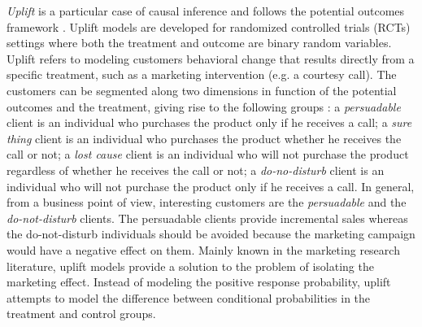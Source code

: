 \documentclass{article}
\begin{document}
\textit{Uplift} is a particular case of causal inference and follows the potential outcomes framework \citep{rubin1974estimating, holland1986statistics}. Uplift models are developed for randomized controlled trials (RCTs) settings where both the treatment and outcome are binary random variables. Uplift refers to modeling customers behavioral change that results directly from a specific treatment, such as a marketing intervention (e.g. a courtesy call). The customers can be segmented along two dimensions in function of the potential outcomes and the treatment, giving rise to the following groups \citep{kane2014mining} : a \textit{persuadable} client is an individual who purchases the product only if he receives a call; a \textit{sure thing} client is an individual who purchases the product whether he receives the call or not; a \textit{lost cause} client is an individual who will not purchase the product regardless of whether he receives the call or not; a \textit{do-no-disturb} client is an individual who will not purchase the product only if he receives a call. In general, from a business point of view, interesting customers are the \textit{persuadable} and the \textit{do-not-disturb} clients. The persuadable clients provide incremental sales whereas the do-not-disturb individuals should be avoided because the marketing campaign would have a negative effect on them. Mainly known in the marketing research literature, uplift models \citep{radcliffe1999differential, hansotia2002direct, lo2002true, radcliffe2007using} provide a solution to the problem of isolating the marketing effect. Instead of modeling the positive response probability, uplift attempts to model the difference between conditional probabilities in the treatment and control groups. %
\end{document}
